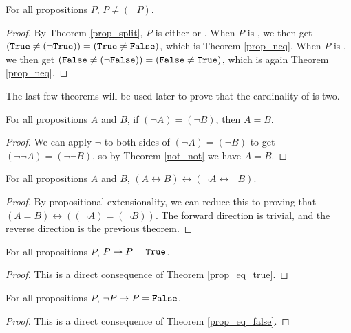 \documentclass[../../math.tex]{subfiles}
\begin{document}
\begin{theorem}
    For all propositions $P$, $P \neq (\neg P)$.
\end{theorem}
\begin{proof}
    By Theorem \ref{prop_split}, $P$ is either  or .  When
    $P$ is , we then get $(\vtt{True} \neq (\neg \vtt{True})) =
    (\vtt{True} \neq \vtt{False})$, which is Theorem \ref{prop_neq}.  When $P$
    is , we then get $(\vtt{False} \neq (\neg \vtt{False})) =
    (\vtt{False} \neq \vtt{True})$, which is again Theorem \ref{prop_neq}.
\end{proof}
\noindent The last few theorems will be used later to prove that the cardinality
of  is two.

\begin{theorem} \label{not_eq_eq}
    For all propositions $A$ and $B$, if $(\neg A) = (\neg B)$, then $A = B$.
\end{theorem}
\begin{proof}
    We can apply $\neg$ to both sides of $(\neg A) = (\neg B)$ to get $(\neg
    \neg A) = (\neg \neg B)$, so by Theorem \ref{not_not} we have $A = B$.
\end{proof}

\begin{theorem} \label{not_eq_iff}
    For all propositions $A$ and $B$, $(A \leftrightarrow B) \leftrightarrow
    (\neg A \leftrightarrow \neg B)$.
\end{theorem}
\begin{proof}
    By propositional extensionality, we can reduce this to proving that $(A = B)
    \leftrightarrow ((\neg A) = (\neg B))$.  The forward direction is trivial,
    and the reverse direction is the previous theorem.
\end{proof}

\begin{theorem} \label{prop_is_true}
    For all propositions $P$, $P \to P = \verb|True|$.
\end{theorem}
\begin{proof}
    This is a direct consequence of Theorem \ref{prop_eq_true}.
\end{proof}

\begin{theorem} \label{prop_is_false}
    For all propositions $P$, $\neg P \to P = \verb|False|$.
\end{theorem}
\begin{proof}
    This is a direct consequence of Theorem \ref{prop_eq_false}.
\end{proof}
\end{document}
